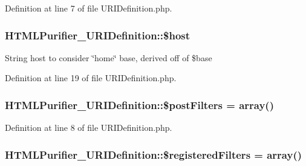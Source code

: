 Definition at line 7 of file U\+R\+I\+Definition.\+php.

\hypertarget{classHTMLPurifier__URIDefinition_abb18dbc906edbfcf04d153386a3a10c8}{
\subsubsection[{\$host}]{\setlength{\rightskip}{0pt plus 5cm}H\+T\+M\+L\+Purifier\+\_\+\+U\+R\+I\+Definition\+::\$host}}\label{classHTMLPurifier__URIDefinition_abb18dbc906edbfcf04d153386a3a10c8}
String host to consider \char`\"{}home\char`\"{} base, derived off of \$base 

Definition at line 19 of file U\+R\+I\+Definition.\+php.

\hypertarget{classHTMLPurifier__URIDefinition_a0f4eb7bc917cbaf1af581572743389fc}{
\subsubsection[{\$post\+Filters}]{\setlength{\rightskip}{0pt plus 5cm}H\+T\+M\+L\+Purifier\+\_\+\+U\+R\+I\+Definition\+::\$post\+Filters = array()\hspace{0.3cm}{\ttfamily [protected]}}}\label{classHTMLPurifier__URIDefinition_a0f4eb7bc917cbaf1af581572743389fc}


Definition at line 8 of file U\+R\+I\+Definition.\+php.

\hypertarget{classHTMLPurifier__URIDefinition_a22a5ccf72975eba6ca2093cd5298f9f9}{
\subsubsection[{\$registered\+Filters}]{\setlength{\rightskip}{0pt plus 5cm}H\+T\+M\+L\+Purifier\+\_\+\+U\+R\+I\+Definition\+::\$registered\+Filters = array()\hspace{0.3cm}{\ttfamily [protected]}}}\label{classHTMLPurifier__URIDefinition_a22a5ccf72975eba6ca2093cd5298f9f9}


